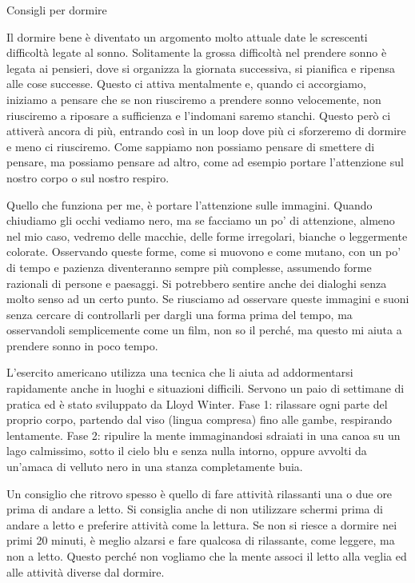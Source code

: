 \documentclass[12pt]{book} %
\begin{document}
\begin{mdframed}[linewidth=1pt]
Consigli per dormire

Il dormire bene è diventato un argomento molto attuale date le screscenti difficoltà legate al
sonno. Solitamente la grossa difficoltà nel prendere sonno è legata ai pensieri, dove si
organizza la giornata successiva, si pianifica e ripensa alle cose successe. Questo ci attiva mentalmente e,
quando ci accorgiamo, iniziamo a pensare che se non riusciremo a prendere sonno velocemente, non riusciremo a riposare
a sufficienza e l'indomani saremo stanchi. Questo però ci attiverà ancora di più, entrando così in
un loop dove più ci sforzeremo di dormire e meno ci riusciremo. Come sappiamo non possiamo pensare di smettere di
pensare, ma possiamo pensare ad altro, come ad esempio portare l'attenzione sul nostro corpo o sul
nostro respiro. 

Quello che funziona per me, è portare l'attenzione sulle immagini. Quando chiudiamo gli occhi vediamo nero, ma se
facciamo un po' di attenzione, almeno nel mio caso, vedremo delle macchie, delle forme irregolari, bianche o
leggermente colorate. Osservando queste forme, come si muovono e come mutano, con un po' di tempo
e pazienza diventeranno sempre più complesse, assumendo forme razionali di persone e paesaggi. Si potrebbero sentire anche
dei dialoghi senza molto senso ad un certo punto. Se riusciamo ad osservare queste immagini e suoni senza cercare di
controllarli per dargli una forma prima del tempo, ma osservandoli semplicemente come un film, non so il perché, ma
questo mi aiuta a prendere sonno in poco tempo.

L'esercito americano utilizza una tecnica che li aiuta ad
addormentarsi rapidamente anche in luoghi e situazioni difficili. Servono un paio di settimane di pratica ed è stato
sviluppato da Lloyd Winter. Fase 1: rilassare ogni parte del proprio corpo, partendo
dal viso (lingua compresa) fino alle gambe, respirando lentamente. Fase 2: ripulire la mente immaginandosi sdraiati in
una canoa su un lago calmissimo, sotto il cielo blu e senza nulla intorno, oppure avvolti da un'amaca di velluto nero
in una stanza completamente buia.

Un consiglio che ritrovo spesso è quello di
fare attività rilassanti una o due ore prima di andare a letto. Si consiglia anche di non utilizzare schermi prima
di andare a letto e preferire attività come la lettura. Se non si riesce a dormire nei primi 20 minuti, è meglio
alzarsi e fare qualcosa di rilassante, come leggere, ma non a letto. Questo perché non vogliamo che la mente associ il
letto alla veglia ed alle attività diverse dal dormire. 


\end{mdframed}
\end{document}

